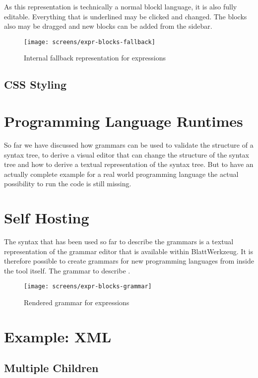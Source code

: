 \documentclass[sigconf,review=true]{acmart}
\begin{document}
As this representation is technically a normal blockl language, it is also fully editable. Everything that is underlined may be clicked and changed. The blocks also may be dragged and new blocks can be added from the sidebar.

\begin{figure}
  \texttt{[image: screens/expr-blocks-fallback]}
  \caption{Internal fallback representation for expressions}
  \label{fig:screen-editor-expr-fallback}
\end{figure}

\subsection{CSS Styling}

\section{Programming Language Runtimes}

So far we have discussed how grammars can be used to validate the structure of a syntax tree, to derive a visual editor that can change the structure of the syntax tree and how to derive a textual representation of the syntax tree. But to have an actually complete example for a real world programming language the actual possibility to run the code is still missing.

\section{Self Hosting}

The syntax that has been used so far to describe the grammars is a textual representation of the grammar editor that is available within Blatt\-Werkzeug. It is therefore possible to create grammars for new programming languages from inside the tool itself. The grammar to describe .

\begin{figure}
  \texttt{[image: screens/expr-blocks-grammar]}
  \caption{Rendered grammar for expressions}
  \label{fig:screen-editor-expr-grammar}
\end{figure}

\section{Example: XML}

\subsection{Multiple Children}
\end{document}
